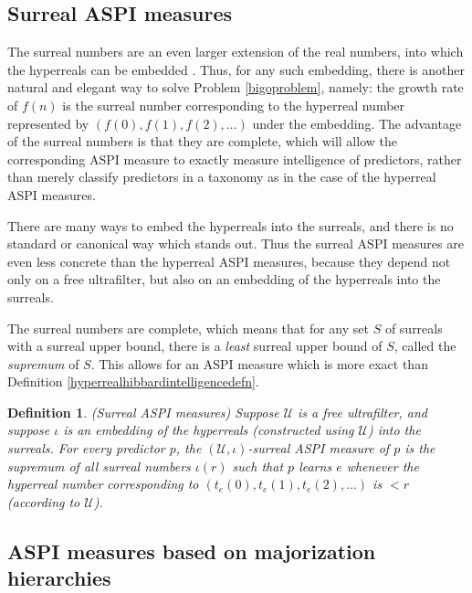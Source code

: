 \documentclass{article}
\newtheorem{definition}[theorem]{Definition}
\begin{document}
\subsection{Surreal ASPI measures}

The surreal numbers \cite{conway} \cite{knuth} are an even larger extension
of the real numbers, into which the hyperreals can be embedded
\cite{ehrlich2012absolute}.
Thus, for any such embedding,
there is another natural and elegant way to solve Problem \ref{bigoproblem},
namely: the growth rate of $f(n)$ is the surreal number corresponding to the
hyperreal number represented by $(f(0),f(1),f(2),\ldots)$ under the embedding.
The advantage of the surreal numbers is that they are complete, which will allow
the corresponding ASPI measure to exactly measure intelligence of predictors,
rather than merely classify predictors in a taxonomy as in the case of
the hyperreal ASPI measures.

There are many ways to embed the hyperreals into the surreals, and there is no
standard or canonical way which stands out. Thus the surreal ASPI measures are even less
concrete than the hyperreal ASPI measures, because they depend not only on a
free ultrafilter, but also on an embedding of the hyperreals into the surreals.

The surreal numbers are complete, which means that for
any set $S$ of surreals with a surreal upper bound,
there is a \emph{least} surreal upper bound of $S$, called the \emph{supremum} of $S$.
This allows for an ASPI measure which is more exact
than Definition \ref{hyperrealhibbardintelligencedefn}.

\begin{definition}
\label{surrealhibbardintelligencedefn}
    (Surreal ASPI measures)
    Suppose $\mathcal U$ is a free ultrafilter, and suppose $\iota$ is an embedding
    of the hyperreals (constructed using $\mathcal U$) into the surreals.
    For every predictor $p$, the \emph{$(\mathcal U,\iota)$-surreal ASPI measure} of $p$
    is the supremum of all surreal numbers $\iota(r)$ such that
    $p$ learns $e$ whenever the hyperreal number corresponding to
    $(t_e(0),t_e(1),t_e(2),\ldots)$ is $<r$ (according to $\mathcal U$).
\end{definition}

\subsection{ASPI measures based on majorization hierarchies}
\end{document}
